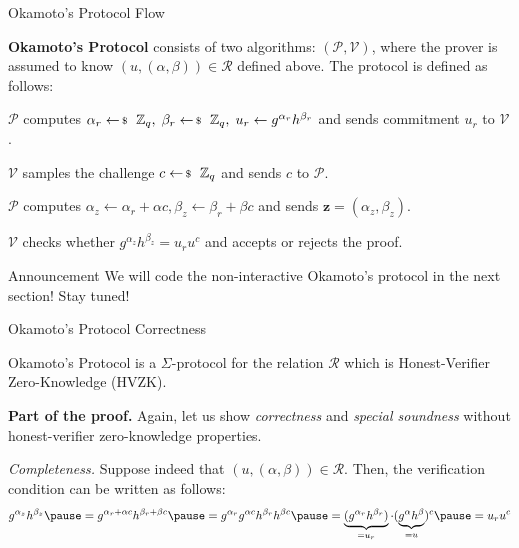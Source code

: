 \documentclass{zkdl-presentation-template}
\begin{document}
    \begin{frame}{Okamoto's Protocol Flow}
        \begin{definition}
            \textbf{Okamoto's Protocol} consists of two algorithms: $(\mathcal{P}, \mathcal{V})$, where the prover is assumed to know $(u,(\alpha,\beta)) \in \mathcal{R}$ defined above. The protocol is defined as follows:\pause
            \begin{algoen}
                \item $\mathcal{P}$ computes $\alpha_r \leftarrowS \mathbb{Z}_q, \; \beta_r \leftarrowS \mathbb{Z}_q, \; u_r \gets g^{\alpha_r}h^{\beta_r}$ and sends commitment $u_r$ to $\mathcal{V}$.\pause
                \item $\mathcal{V}$ samples the challenge $c \leftarrowS \mathbb{Z}_q$ and sends $c$ to $\mathcal{P}$.\pause
                \item $\mathcal{P}$ computes $\alpha_z \gets \alpha_r + \alpha c, \beta_z \gets \beta_r + \beta c$ and sends $\mathbf{z} = (\alpha_z,\beta_z)$.\pause
                \item $\mathcal{V}$ checks whether $g^{\alpha_z}h^{\beta_z} = u_r u^c$ and accepts or rejects the proof.\pause
            \end{algoen}
        \end{definition}

        \begin{alertblock}{Announcement}
            We will code the non-interactive Okamoto's protocol in the next section! Stay tuned!
        \end{alertblock}
    \end{frame}

    \begin{frame}{Okamoto's Protocol Correctness}
        \begin{theorem}
            Okamoto's Protocol is a $\Sigma$-protocol for the relation $\mathcal{R}$ which is Honest-Verifier Zero-Knowledge (HVZK).
        \end{theorem}
        \pause

        \textbf{Part of the proof.} Again, let us show \textit{correctness} and \textit{special soundness} without honest-verifier zero-knowledge properties.\pause

        \textit{Completeness.} Suppose indeed that $(u,(\alpha,\beta)) \in \mathcal{R}$. Then, the verification condition can be written as follows:\pause
        \begin{equation*}
            g^{\alpha_z}h^{\beta_z} \pause = g^{\alpha_r + \alpha c}h^{\beta_r + \beta c} \pause = g^{\alpha_r}g^{\alpha c}h^{\beta_r}h^{\beta c} \pause = \underbrace{(g^{\alpha_r}h^{\beta_r})}_{=u_r} \cdot (\underbrace{g^{\alpha}h^{\beta}}_{=u})^c \pause = u_r u^c
        \end{equation*}
    \end{frame}
\end{document}

